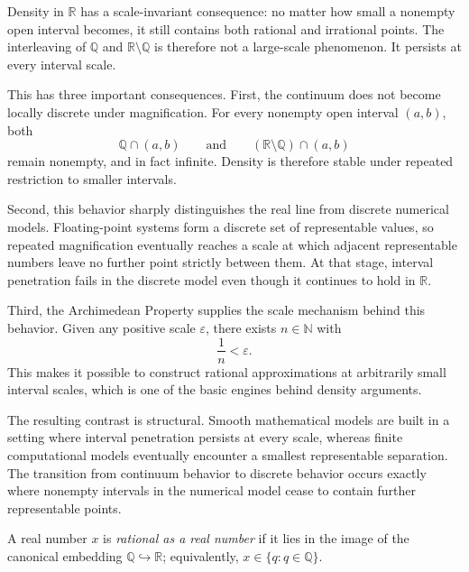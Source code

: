 \begin{exposition}
Density in $\mathbb{R}$ has a scale-invariant consequence: no matter how small a nonempty
open interval becomes, it still contains both rational and irrational points. The interleaving
of $\mathbb{Q}$ and $\mathbb{R}\setminus\mathbb{Q}$ is therefore not a large-scale phenomenon.
It persists at every interval scale.

This has three important consequences. First, the continuum does not become locally discrete
under magnification. For every nonempty open interval $(a,b)$, both
\[
\mathbb{Q}\cap(a,b)
\qquad\text{and}\qquad
(\mathbb{R}\setminus\mathbb{Q})\cap(a,b)
\]
remain nonempty, and in fact infinite. Density is therefore stable under repeated restriction
to smaller intervals.

Second, this behavior sharply distinguishes the real line from discrete numerical models.
Floating-point systems form a discrete set of representable values, so repeated magnification
eventually reaches a scale at which adjacent representable numbers leave no further point
strictly between them. At that stage, interval penetration fails in the discrete model even
though it continues to hold in $\mathbb{R}$.

Third, the Archimedean Property supplies the scale mechanism behind this behavior. Given any
positive scale $\varepsilon$, there exists $n\in\mathbb{N}$ with
\[
\frac{1}{n}<\varepsilon.
\]
This makes it possible to construct rational approximations at arbitrarily small interval
scales, which is one of the basic engines behind density arguments.

The resulting contrast is structural. Smooth mathematical models are built in a setting where
interval penetration persists at every scale, whereas finite computational models eventually
encounter a smallest representable separation. The transition from continuum behavior to
discrete behavior occurs exactly where nonempty intervals in the numerical model cease to
contain further \\representable points.
\end{exposition}



\begin{definition}
\label{def:is-rat}
A real number $x$ is \emph{rational as a real number} if it lies in the image of the canonical embedding $\mathbb Q\hookrightarrow\mathbb R$; equivalently, $x\in\{q:q\in\mathbb Q\}$.
\end{definition}

